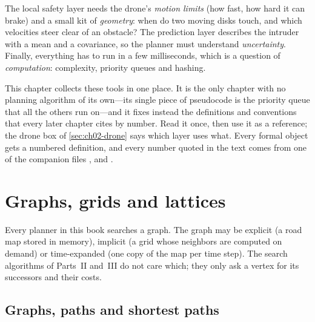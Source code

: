 The local safety layer needs the drone's \emph{motion limits} (how fast, how hard it can brake) and a small kit of \emph{geometry}: when do two moving disks touch, and which velocities steer clear of an obstacle? The prediction layer describes the intruder with a mean and a covariance, so the planner must understand \emph{uncertainty}. Finally, everything has to run in a few milliseconds, which is a question of \emph{computation}: complexity, priority queues and hashing.

This chapter collects these tools in one place. It is the only chapter with no planning algorithm of its own---its single piece of pseudocode is the priority queue that all the others run on---and it fixes instead the definitions and conventions that every later chapter cites by number. Read it once, then use it as a reference; the drone box of \cref{sec:ch02-drone} says which layer uses what. Every formal object gets a numbered definition, and every number quoted in the text comes from one of the companion files ,  and .


\section{Graphs, grids and lattices}
\label{sec:ch02-graphs}

\begin{keyidea}
Every planner in this book searches a graph. The graph may be explicit (a road map stored in memory), implicit (a grid whose neighbors are computed on demand) or time-expanded (one copy of the map per time step). The search algorithms of Parts~II and~III do not care which; they only ask a vertex for its successors and their costs.
\end{keyidea}

\subsection{Graphs, paths and shortest paths}
\label{sec:ch02-graph-defs}

